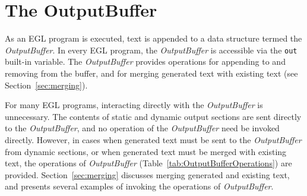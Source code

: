 \section{The OutputBuffer}
As an EGL program is executed, text is appended to a data structure termed 
the \emph{OutputBuffer}. In every EGL program, the \emph{OutputBuffer} is 
accessible via the \texttt{out} built-in variable. The \emph{OutputBuffer} 
provides operations for appending to and removing from the buffer, and for 
merging generated text with existing text (see Section~\ref{sec:merging}).

For many EGL programs, interacting directly with the \emph{OutputBuffer} is 
unnecessary. The contents of static and dynamic output sections are sent 
directly to the \emph{OutputBuffer}, and no operation of the \emph{OutputBuffer}
need be invoked directly. However, in cases when generated text must be sent
to the \emph{OutputBuffer} from dynamic sections, or when generated text must
be merged with existing text, the operations of \emph{OutputBuffer} (Table~\ref{tab:OutputBufferOperations}) are provided. Section~\ref{sec:merging}
discusses merging generated and existing text, and presents several examples
of invoking the operations of \emph{OutputBuffer}.

